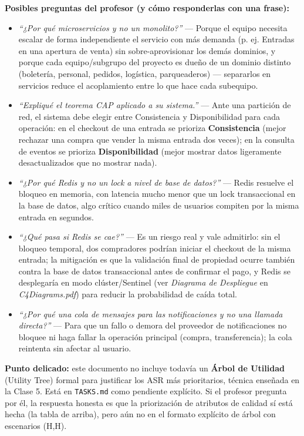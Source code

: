 \documentclass[12pt,a4paper]{article}
\begin{document}
\begin{pregunta}
\textbf{Posibles preguntas del profesor (y cómo responderlas con una frase):}
\begin{itemize}
\item \textit{``¿Por qué microservicios y no un monolito?''} --- Porque el equipo necesita escalar
de forma independiente el servicio con más demanda (p. ej. Entradas en una apertura de venta) sin
sobre-aprovisionar los demás dominios, y porque cada equipo/subgrupo del proyecto es dueño de un
dominio distinto (boletería, personal, pedidos, logística, parqueaderos) --- separarlos en
servicios reduce el acoplamiento entre lo que hace cada subequipo.
\item \textit{``Expliqué el teorema CAP aplicado a su sistema.''} --- Ante una partición de red, el
sistema debe elegir entre Consistencia y Disponibilidad para cada operación: en el checkout de una
entrada se prioriza \textbf{Consistencia} (mejor rechazar una compra que vender la misma entrada
dos veces); en la consulta de eventos se prioriza \textbf{Disponibilidad} (mejor mostrar datos
ligeramente desactualizados que no mostrar nada).
\item \textit{``¿Por qué Redis y no un lock a nivel de base de datos?''} --- Redis resuelve el
bloqueo en memoria, con latencia mucho menor que un lock transaccional en la base de datos, algo
crítico cuando miles de usuarios compiten por la misma entrada en segundos.
\item \textit{``¿Qué pasa si Redis se cae?''} --- Es un riesgo real y vale admitirlo: sin el
bloqueo temporal, dos compradores podrían iniciar el checkout de la misma entrada; la mitigación es
que la validación final de propiedad ocurre también contra la base de datos transaccional antes de
confirmar el pago, y Redis se desplegaría en modo clúster/Sentinel (ver \textit{Diagrama de
Despliegue} en \textit{C4Diagrams.pdf}) para reducir la probabilidad de caída total.
\item \textit{``¿Por qué una cola de mensajes para las notificaciones y no una llamada directa?''}
--- Para que un fallo o demora del proveedor de notificaciones no bloquee ni haga fallar la
operación principal (compra, transferencia); la cola reintenta sin afectar al usuario.
\end{itemize}
\end{pregunta}

\begin{alerta}
\textbf{Punto delicado:} este documento no incluye todavía un \textbf{Árbol de Utilidad} (Utility
Tree) formal para justificar los ASR más prioritarios, técnica enseñada en la Clase 5. Está en
\texttt{TASKS.md} como pendiente explícito. Si el profesor pregunta por él, la respuesta honesta es
que la priorización de atributos de calidad sí está hecha (la tabla de arriba), pero aún no en el
formato explícito de árbol con escenarios (H,H).
\end{alerta}
\end{document}
